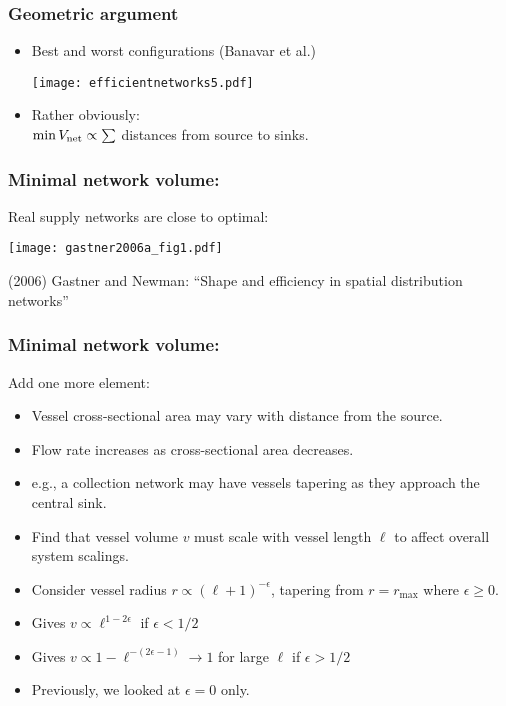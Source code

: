 \begin{frame}
  \frametitle{Geometric argument}

  \begin{itemize}
  \item<1-> Best and worst configurations (Banavar et al.)
    \begin{center}
      \texttt{[image: efficientnetworks5.pdf]}
    \end{center}
    \bigskip
  \item<2-> \alert{Rather obviously:}\\
    $\min V_{\textnormal{net}} \propto \sum$
    distances
    from source to sinks.

  \end{itemize}

\end{frame}

\begin{frame}
  \frametitle{Minimal network volume:}

  Real supply networks are close to optimal:

  \texttt{[image: gastner2006a\_fig1.pdf]}

  \bigskip

  {\small (2006)
    Gastner and Newman\cite{gastner2006a}:
    ``Shape and efficiency in spatial distribution networks'' }

\end{frame}

\begin{frame}
  \frametitle{Minimal network volume:}

  \begin{block}{Add one more element:}
    \begin{itemize}
    \item Vessel cross-sectional area
      may vary with distance from the source.
    \item
      Flow rate increases as cross-sectional area decreases.
    \item e.g., a collection network may
      have vessels tapering as they approach
      the central sink.
    \item
      Find that vessel volume $v$ must scale
      with vessel length $\ell$ to affect overall
      system scalings.
    \item
      Consider vessel radius $r \propto (\ell+1)^{-\epsilon}$,
      tapering from $r=r_{\max}$ where $\epsilon \ge 0$.
    \item
      Gives
      $
      v \propto \ell^{1-2\epsilon}
      $ if $\epsilon < 1/2$
    \item
      Gives
      $
      v \propto 1 - \ell^{-(2\epsilon-1)} \rightarrow 1$ for large $\ell$
      if $\epsilon > 1/2$
    \item
      Previously, we looked at $\epsilon=0$ only.
    \end{itemize}
  \end{block}
\end{frame}


